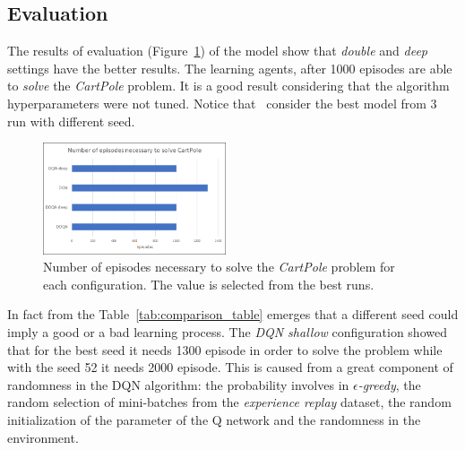 \subsection{Evaluation}

The results of evaluation (Figure~\ref{fig:comparison}) of the model show that \textit{double} and \textit{deep} settings have the better results. The learning agents, after 1000 episodes are able to \textit{solve} the \textit{CartPole} problem. It is a good result considering that the algorithm hyperparameters were not tuned. Notice that \auth~consider the best model from 3 run with different seed. 

\begin{figure}[t]
	\centering
	\includegraphics[width=0.48\textwidth]{res/Comparison}
	\caption{Number of episodes necessary to solve the \textit{CartPole} problem for each configuration. The value is selected from the best runs.}
	\label{fig:comparison}
\end{figure}

In fact from the Table~\ref{tab:comparison_table} emerges that a different seed could imply a good or a bad learning process. The \textit{DQN shallow} configuration showed that for the best seed it needs 1300 episode in order to solve the problem while with the seed 52 it needs 2000 episode. This is caused from a great component of randomness in the DQN algorithm: the probability involves in \textit{$\epsilon$-greedy}, the random selection of mini-batches from the \textit{experience replay} dataset, the random initialization of the parameter of the Q network and the randomness in the environment.

